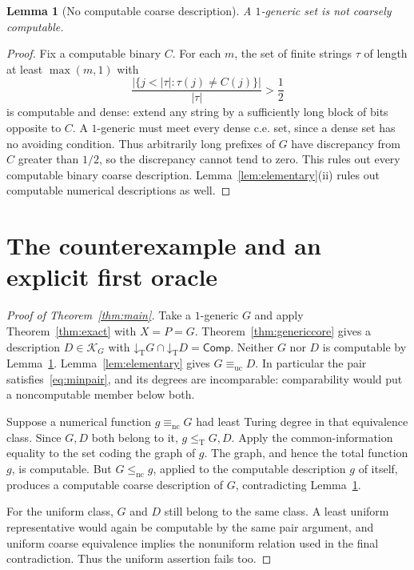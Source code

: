 \documentclass[11pt,a4paper]{article}
\newcommand{\leT}{\leq_{\mathrm T}}
\newcommand{\lenc}{\leq_{\mathrm{nc}}}
\newcommand{\eqnc}{\equiv_{\mathrm{nc}}}
\newcommand{\equc}{\equiv_{\mathrm{uc}}}
\newcommand{\Comp}{\mathsf{Comp}}
\newcommand{\low}[1]{\mathord{\downarrow}_{\mathrm T}#1}
\newtheorem{lemma}[theorem]{Lemma}
\theoremstyle{definition}\newtheorem{definition}[theorem]{Definition}
\theoremstyle{remark}\newtheorem{remark}[theorem]{Remark}
\begin{document}
\begin{lemma}[No computable coarse description]\label{lem:notcoarse}
A $1$-generic set is not coarsely computable.
\end{lemma}
\begin{proof}
Fix a computable binary $C$. For each $m$, the set of finite strings $\tau$ of length at least $\max(m,1)$ with
\[
               \frac{|\{j<|\tau|:\tau(j)\ne C(j)\}|}{|\tau|}>\frac12
\]
is computable and dense: extend any string by a sufficiently long block of bits opposite to $C$. A $1$-generic must meet every dense c.e. set, since a dense set has no avoiding condition. Thus arbitrarily long prefixes of $G$ have discrepancy from $C$ greater than $1/2$, so the discrepancy cannot tend to zero. This rules out every computable binary coarse description. Lemma~\ref{lem:elementary}(ii) rules out computable numerical descriptions as well.
\end{proof}

\section{The counterexample and an explicit first oracle}
\label{sec:counterexample}
\begin{proof}[Proof of Theorem~\ref{thm:main}]
Take a $1$-generic $G$ and apply Theorem~\ref{thm:exact} with $X=P=G$. Theorem~\ref{thm:genericcore} gives a description $D\in\mathcal K_G$ with $\low G\cap\low D=\Comp$. Neither $G$ nor $D$ is computable by Lemma~\ref{lem:notcoarse}. Lemma~\ref{lem:elementary} gives $G\equc D$. In particular the pair satisfies~\eqref{eq:minpair}, and its degrees are incomparable: comparability would put a noncomputable member below both.

Suppose a numerical function $g\eqnc G$ had least Turing degree in that equivalence class. Since $G,D$ both belong to it, $g\leT G,D$. Apply the common-information equality to the set coding the graph of $g$. The graph, and hence the total function $g$, is computable. But $G\lenc g$, applied to the computable description $g$ of itself, produces a computable coarse description of $G$, contradicting Lemma~\ref{lem:notcoarse}.

For the uniform class, $G$ and $D$ still belong to the same class. A least uniform representative would again be computable by the same pair argument, and uniform coarse equivalence implies the nonuniform relation used in the final contradiction. Thus the uniform assertion fails too.
\end{proof}
\end{document}

